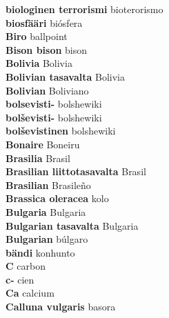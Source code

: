\textbf{ biologinen terrorismi  } bioterorismo \\
\textbf{ biosfääri  } biósfera \\
\textbf{ Biro  } ballpoint \\
\textbf{ Bison bison  } bison \\
\textbf{ Bolivia  } Bolivia \\
\textbf{ Bolivian tasavalta  } Bolivia \\
\textbf{ Bolivian  } Boliviano \\
\textbf{ bolsevisti-  } bolshewiki \\
\textbf{ bolševisti-  } bolshewiki \\
\textbf{ bolševistinen  } bolshewiki \\
\textbf{ Bonaire  } Boneiru \\
\textbf{ Brasilia  } Brasil \\
\textbf{ Brasilian liittotasavalta  } Brasil \\
\textbf{ Brasilian  } Brasileño \\
\textbf{ Brassica oleracea  } kolo \\
\textbf{ Bulgaria  } Bulgaria \\
\textbf{ Bulgarian tasavalta  } Bulgaria \\
\textbf{ Bulgarian  } búlgaro \\
\textbf{ bändi  } konhunto \\
\textbf{ C  } carbon \\
\textbf{ c-  } cien \\
\textbf{ Ca  } calcium \\
\textbf{ Calluna vulgaris  } basora \\
